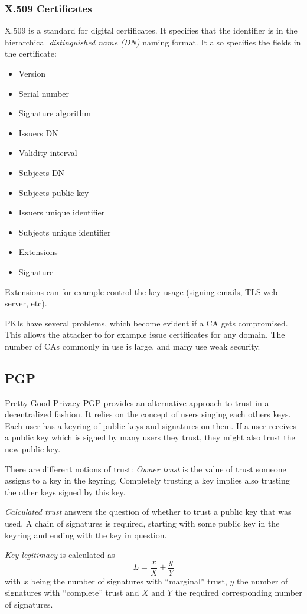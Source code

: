 \subsubsection{X.509 Certificates}
X.509 is a standard for digital certificates. It specifies that the identifier
is in the hierarchical \textit{distinguished name (DN)} naming format. It also
specifies the fields in the certificate:
\begin{itemize}
    \item Version
    \item Serial number
    \item Signature algorithm
    \item Issuers DN
    \item Validity interval
    \item Subjects DN
    \item Subjects public key
    \item Issuers unique identifier
    \item Subjects unique identifier
    \item Extensions
    \item Signature
\end{itemize}
Extensions can for example control the key usage (signing emails, TLS web
server, etc).

PKIs have several problems, which become evident if a CA gets compromised. This
allows the attacker to for example issue certificates for any domain. The number
of CAs commonly in use is large, and many use weak security.

\subsection{PGP}
Pretty Good Privacy PGP provides an alternative approach to trust in a
decentralized fashion. It relies on the concept of users singing each others
keys. Each user has a keyring of public keys and signatures on them. If a user
receives a public key which is signed by many users they trust, they might also
trust the new public key.

There are different notions of trust: \emph{Owner trust} is the value of trust
someone assigns to a key in the keyring. Completely trusting a key implies also
trusting the other keys signed by this key.

\emph{Calculated trust} answers the question of whether to trust a public key
that was used. A chain of signatures is required, starting with some public key
in the keyring and ending with the key in question.

\emph{Key legitimacy} is calculated as
\begin{equation}
    L = \frac{x}{X}+\frac{y}{Y}
\end{equation}
with $x$ being the number of signatures with ``marginal'' trust, $y$ the number
of signatures with ``complete'' trust and $X$ and $Y$ the required corresponding
number of signatures.
